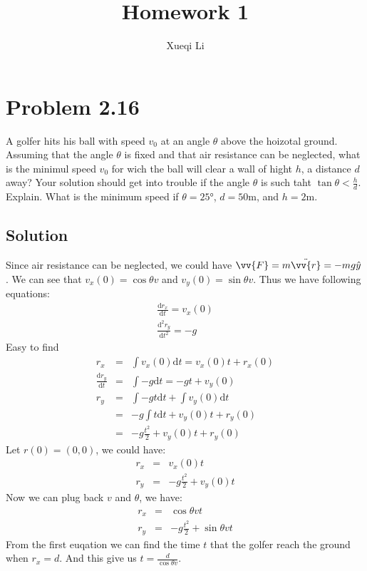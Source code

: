 \documentclass[aps,prl,reprint]{revtex4-1}
\newcommand{\de}{\mathrm{d}}
\begin{document}
\title{Homework 1}
\author{Xueqi Li}
\noaffiliation


\maketitle

\section{Problem 2.16}
A golfer hits his ball with speed $v_0$ at an angle $\theta$ above the hoizotal ground. Assuming that the angle $\theta$ is fixed and that air resistance can be neglected, what is the minimul speed $v_0$ for wich the ball will clear a wall of hight $h$, a distance $d$ away? Your solution should get into trouble if the angle $\theta$ is such taht $\tan\theta < \frac{h}{d}$. Explain. What is the minimum speed if $\theta = \ang{25}$, $d = 50\si{\metre}$, and $h = 2 \si{\metre}$.
\subsection{Solution}
Since air resistance can be neglected, we could have $\vv{F}= m \ddot{\vv{r}} = -mg\hat{y}$. We can see that $v_x(0) = \cos\theta v$ and $v_y(0) = \sin\theta v$. Thus we have following equations:
\begin{eqnarray*}
    \frac{\de r_x}{\de t} = v_x(0) \\
    \frac{\de^2 r_y}{\de t^2} = -g
\end{eqnarray*}
Easy to find
\begin{eqnarray*}
    r_x &=& \int v_x(0) \de t = v_x(0) t + r_x(0)\\
    \frac{\de r_y}{\de t} &=& \int -g \de t = -gt + v_y(0)\\
    r_y &=& \int -gt \de t + \int v_y(0)\de t \\
        &=& -g \int t \de t + v_y(0) t + r_y(0) \\
        &=& -g \frac{t^2}{2} + v_y(0) t + r_y(0)
\end{eqnarray*}
Let $r(0) = (0,0)$, we could have:
\begin{eqnarray*}
    r_x &=& v_x(0) t\\
    r_y &=& -g \frac{t^2}{2} + v_y(0) t
\end{eqnarray*}
Now we can plug back $v$ and $\theta$, we have:
\begin{eqnarray*}
    r_x &=& \cos\theta v t\\
    r_y &=& -g \frac{t^2}{2} + \sin\theta v t
\end{eqnarray*}
From the first euqation we can find the time $t$ that the golfer reach the ground when $r_x = d$. And this give us $t = \frac{d}{\cos\theta v}$.
\end{document}
